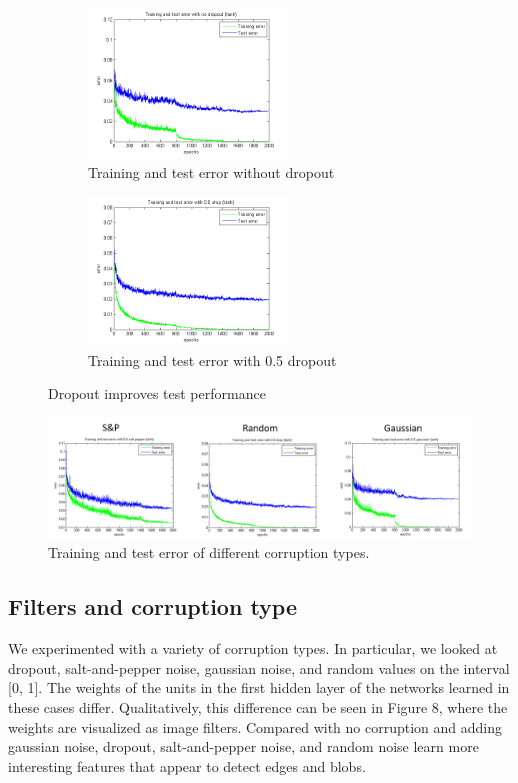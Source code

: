 \documentclass{article} %
\begin{document}
\begin{figure}
\centering
\begin{subfigure}{.5\textwidth}
  \centering
  \includegraphics[width=150pt]{trainingTestErrorNoDropoutTanh.png}
  \caption{Training and test error without dropout}
  \label{fig:train_nodrop}
\end{subfigure}%
\begin{subfigure}{.5\textwidth}
  \centering
  \includegraphics[width=150pt]{trainingTestError05DropTanh.png}
  \caption{Training and test error with 0.5 dropout}
  \label{fig:train_05}
\end{subfigure}
\caption{Dropout improves test performance}
\label{fig:train}
\end{figure}

\begin{figure}
\begin{center}
\includegraphics[width=\textwidth]{trainingTestErrorSPRandomGaussian.png}
\caption{Training and test error of different corruption types.}
\end{center}
\end{figure}

\subsection{Filters and corruption type}
We experimented with a variety of corruption types. In particular, we looked at dropout, salt-and-pepper noise, gaussian noise, and random values on the interval [0, 1]. The weights of the units in the first hidden layer of the networks learned in these cases differ. Qualitatively, this difference can be seen in Figure 8, where the weights are visualized as image filters. Compared with no corruption and adding gaussian noise, dropout, salt-and-pepper noise, and random noise learn more interesting features that appear to detect edges and blobs.
\end{document}
